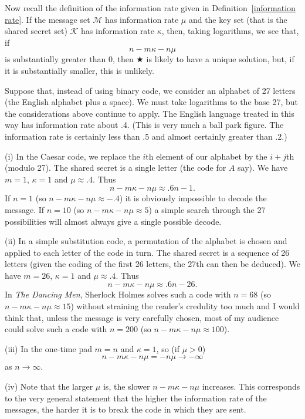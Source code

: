 Now recall the definition of the information rate
given in Definition~\ref{information rate}.
If the message set ${\mathcal M}$
has information rate $\mu$
and the key set (that is the
shared secret set) $\mathcal{K}$
has information rate $\kappa$, then, taking logarithms,
we see that, if
\[n-m\kappa-n\mu\]
is substantially greater than $0$, then $\bigstar$
is likely to have a unique solution, but, if it is
substantially smaller, this is unlikely.
\begin{example} Suppose that,
instead of using binary
code, we consider an alphabet of 27 letters
(the English alphabet plus a space). We must
take logarithms to the base 27, but the considerations
above continue to apply. The English language
treated in this way has information rate
about .4. (This is very much a ball park figure.
The information rate is certainly less than .5
and almost certainly greater than .2.)

(i) In the Caesar code, we replace the $i$th element
of our alphabet by the $i+j$th (modulo 27). The
shared secret is a single letter (the code for $A$ say).
We have $m=1$, $\kappa=1$ and $\mu\approx .4$. Thus
\[n-m\kappa-n\mu\approx .6n-1.\]
If $n=1$ (so $n-m\kappa-n\mu\approx-.4$) it is obviously
impossible to decode the message. If $n=10$
(so $n-m\kappa-n\mu\approx 5$) a simple search through the
27 possibilities will almost always give a single
possible decode.

(ii) In a simple substitution code, a permutation of the
alphabet is chosen and applied to each letter of the
code in turn. The shared secret is a sequence of
26 letters (given the coding of the first 26 letters,
the 27th can then be deduced).
We have $m=26$, $\kappa=1$ and $\mu\approx .4$. Thus
\[n-m\kappa-n\mu\approx .6n-26.\]
In \emph{The Dancing Men}, Sherlock Holmes
solves such a code with $n=68$
(so $n-m\kappa-n\mu\approx 15$) without straining
the reader's credulity too much and I
would think that, unless the message is
very carefully chosen, most of my audience
could solve such a code with $n=200$
(so $n-m\kappa-n\mu\approx 100$).

(iii) In the one-time pad $m=n$ and $\kappa=1$,
so (if $\mu>0$)
\[n-m\kappa-n\mu=-n\mu\rightarrow-\infty\]
as $n\rightarrow\infty$.

(iv) Note that the larger $\mu$ is, the slower
$n-m\kappa-n\mu$ increases. This corresponds
to the very general statement that the
higher the information rate of the messages,
the harder it is to break the code in which they
are sent.
\end{example}

